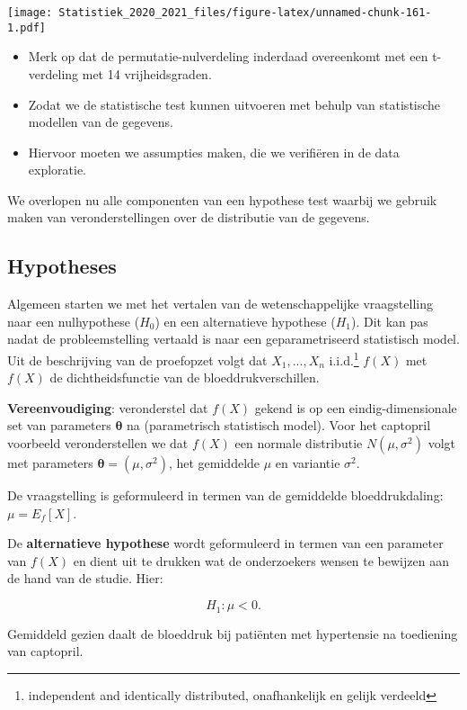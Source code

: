 \documentclass[
  12pt,dutch,coursenotes]{book}
\theoremstyle{definition}
\theoremstyle{definition}
\theoremstyle{definition}
\theoremstyle{remark}
\begin{document}
\texttt{[image: Statistiek\_2020\_2021\_files/figure-latex/unnamed-chunk-161-1.pdf]}

\begin{itemize}
\item
  Merk op dat de permutatie-nulverdeling inderdaad overeenkomt met een t-verdeling met 14 vrijheidsgraden.
\item
  Zodat we de statistische test kunnen uitvoeren met behulp van statistische modellen van de gegevens.
\item
  Hiervoor moeten we assumpties maken, die we verifiëren in de data exploratie.
\end{itemize}

We overlopen nu alle componenten van een hypothese test waarbij we gebruik maken van veronderstellingen over de distributie van de gegevens.

\hypertarget{hypotheses}{%
\subsection{Hypotheses}\label{hypotheses}}

Algemeen starten we met het vertalen van de wetenschappelijke vraagstelling naar een nulhypothese (\(H_0\)) en een alternatieve hypothese (\(H_1\)).
Dit kan pas nadat de probleemstelling vertaald is naar een geparametriseerd statistisch model.
Uit de beschrijving van de proefopzet volgt dat \(X_1,...,X_n\) i.i.d.\footnote{independent and identically distributed, onafhankelijk en gelijk verdeeld} \(f(X)\)
met \(f(X)\) de dichtheidsfunctie van de bloeddrukverschillen.

\textbf{Vereenvoudiging}: veronderstel dat \(f(X)\) gekend is op een eindig-dimensionale set van parameters \(\mathbf{\theta}\) na (parametrisch statistisch model).
Voor het captopril voorbeeld veronderstellen we dat \(f(X)\) een normale distributie \(N(\mu,\sigma^2)\) volgt met parameters \(\mathbf{\theta}=(\mu,\sigma^2)\), het gemiddelde \(\mu\) en variantie \(\sigma^2\).

De vraagstelling is geformuleerd in termen van de gemiddelde bloeddrukdaling: \(\mu=E_f[X]\).

De \textbf{alternatieve hypothese} wordt geformuleerd in termen van een parameter van \(f(X)\) en dient uit te drukken wat de onderzoekers wensen te bewijzen aan de hand van de studie.
Hier:

\[H_1: \mu<0.\]

Gemiddeld gezien daalt de bloeddruk bij patiënten met hypertensie na toediening van captopril.
\end{document}

